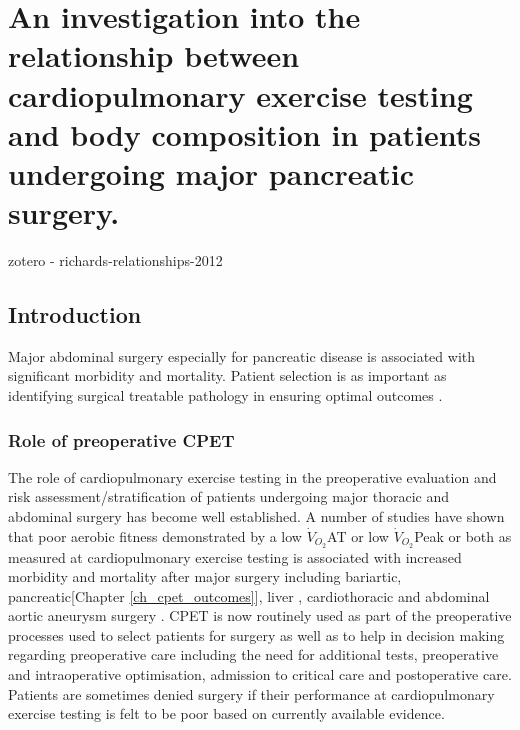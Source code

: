 \chapter{An investigation into the relationship between cardiopulmonary exercise testing and body composition in patients undergoing major pancreatic surgery.}
\label{ch_bodycomp}


\clearpage

zotero - richards-relationships-2012

\section{Introduction}
Major abdominal surgery especially for pancreatic disease is associated with significant morbidity and mortality. 
Patient selection is as important as identifying surgical treatable pathology in ensuring optimal outcomes \parencite{balthazar_acute_2002}.

\subsection{Role of preoperative CPET}
The role of cardiopulmonary exercise testing in the preoperative evaluation and risk assessment/stratification of patients undergoing major thoracic and abdominal surgery has become well established. 
A number of studies have shown that poor aerobic fitness demonstrated by a low $\dot{V}_{O_2}$AT or low $\dot{V}_{O_2}$Peak or both as measured at cardiopulmonary exercise testing is associated with increased morbidity and mortality after major surgery including bariartic\parencite{mccullough_cardiorespiratory_2006}, pancreatic\parencite{ausania_effects_2012}[Chapter \ref{ch_cpet_outcomes}], liver \parencite{epstein_aerobic_2004}, cardiothoracic\parencite{brunelli_risk_2010, campione_oxygen_2010,torchio_exercise_2010} and abdominal aortic aneurysm surgery \parencite{carlisle_mid-term_2007,thompson_cardiopulmonary_2011}. 
CPET is now routinely used as part of the preoperative processes used to select patients for surgery as well as to help in decision making regarding preoperative care including the need for additional tests, preoperative and intraoperative optimisation, admission to critical care and postoperative care.
Patients are sometimes denied surgery if their performance at cardiopulmonary exercise testing is felt to be poor based on currently available evidence.

